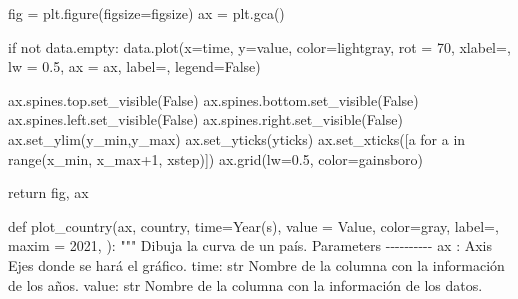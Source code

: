 \documentclass[
  letterpaper,
  DIV=11,
  numbers=noendperiod]{scrreprt}
\newenvironment{Shaded}{\begin{snugshade}}{\end{snugshade}}
\newcommand{\BuiltInTok}[1]{\textcolor[rgb]{0.00,0.23,0.31}{#1}}
\newcommand{\CommentTok}[1]{\textcolor[rgb]{0.37,0.37,0.37}{#1}}
\newcommand{\ControlFlowTok}[1]{\textcolor[rgb]{0.00,0.23,0.31}{#1}}
\newcommand{\DecValTok}[1]{\textcolor[rgb]{0.68,0.00,0.00}{#1}}
\newcommand{\FloatTok}[1]{\textcolor[rgb]{0.68,0.00,0.00}{#1}}
\newcommand{\KeywordTok}[1]{\textcolor[rgb]{0.00,0.23,0.31}{#1}}
\newcommand{\NormalTok}[1]{\textcolor[rgb]{0.00,0.23,0.31}{#1}}
\newcommand{\OperatorTok}[1]{\textcolor[rgb]{0.37,0.37,0.37}{#1}}
\newcommand{\StringTok}[1]{\textcolor[rgb]{0.13,0.47,0.30}{#1}}
\newcommand{\VariableTok}[1]{\textcolor[rgb]{0.07,0.07,0.07}{#1}}
\begin{document}
\begin{Shaded}
\begin{Highlighting}[]
\NormalTok{    fig }\OperatorTok{=}\NormalTok{ plt.figure(figsize}\OperatorTok{=}\NormalTok{figsize)}
\NormalTok{    ax }\OperatorTok{=}\NormalTok{ plt.gca()}
    
    \ControlFlowTok{if} \KeywordTok{not}\NormalTok{ data.empty:}
\NormalTok{        data.plot(x}\OperatorTok{=}\NormalTok{time, y}\OperatorTok{=}\NormalTok{value, color}\OperatorTok{=}\StringTok{\textquotesingle{}lightgray\textquotesingle{}}\NormalTok{, rot }\OperatorTok{=} \DecValTok{70}\NormalTok{, xlabel}\OperatorTok{=}\StringTok{\textquotesingle{}\textquotesingle{}}\NormalTok{, lw }\OperatorTok{=} \FloatTok{0.5}\NormalTok{, ax }\OperatorTok{=}\NormalTok{ ax, label}\OperatorTok{=}\StringTok{\textquotesingle{}\textquotesingle{}}\NormalTok{, legend}\OperatorTok{=}\VariableTok{False}\NormalTok{)}
        
\NormalTok{    ax.spines.top.set\_visible(}\VariableTok{False}\NormalTok{)}
\NormalTok{    ax.spines.bottom.set\_visible(}\VariableTok{False}\NormalTok{)}
\NormalTok{    ax.spines.left.set\_visible(}\VariableTok{False}\NormalTok{)}
\NormalTok{    ax.spines.right.set\_visible(}\VariableTok{False}\NormalTok{)}
\NormalTok{    ax.set\_ylim(y\_min,y\_max)}
\NormalTok{    ax.set\_yticks(yticks)}
\NormalTok{    ax.set\_xticks([a }\ControlFlowTok{for}\NormalTok{ a }\KeywordTok{in} \BuiltInTok{range}\NormalTok{(x\_min, x\_max}\OperatorTok{+}\DecValTok{1}\NormalTok{, xstep)])}
\NormalTok{    ax.grid(lw}\OperatorTok{=}\FloatTok{0.5}\NormalTok{, color}\OperatorTok{=}\StringTok{\textquotesingle{}gainsboro\textquotesingle{}}\NormalTok{)}

    \ControlFlowTok{return}\NormalTok{ fig, ax}

\KeywordTok{def}\NormalTok{ plot\_country(ax, country, time}\OperatorTok{=}\StringTok{\textquotesingle{}Year(s)\textquotesingle{}}\NormalTok{, value }\OperatorTok{=} \StringTok{\textquotesingle{}Value\textquotesingle{}}\NormalTok{, color}\OperatorTok{=}\StringTok{\textquotesingle{}gray\textquotesingle{}}\NormalTok{, label}\OperatorTok{=}\StringTok{\textquotesingle{}\textquotesingle{}}\NormalTok{, maxim }\OperatorTok{=} \DecValTok{2021}\NormalTok{, ): }
    \CommentTok{"""}
\CommentTok{    Dibuja la curva de un país.}
\CommentTok{    }
\CommentTok{    Parameters}
\CommentTok{    {-}{-}{-}{-}{-}{-}{-}{-}{-}{-}}
\CommentTok{    ax : Axis}
\CommentTok{        Ejes donde se hará el gráfico.}
\CommentTok{        }
\CommentTok{    time: str}
\CommentTok{        Nombre de la columna con la información de los años.}
\CommentTok{        }
\CommentTok{    value: str}
\CommentTok{        Nombre de la columna con la información de los datos.}


\end{Highlighting}
\end{Shaded}
\end{document}
